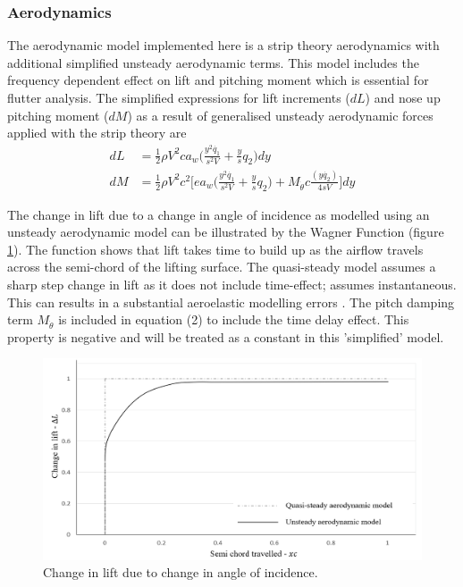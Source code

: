 \documentclass[11pt]{article}
\begin{document}
\subsubsection{Aerodynamics}
The aerodynamic model implemented here is a strip theory aerodynamics with additional simplified unsteady aerodynamic terms. This model includes the frequency dependent effect on lift and pitching moment which is essential for flutter analysis. The simplified expressions for lift increments ($dL$) and nose up pitching moment ($dM$) as a result of generalised unsteady aerodynamic forces applied with the strip theory are 
\begin{align}
dL &= \frac{1}{2}\rho V^2ca_w\Big( \frac{y^2\dot{q_1}}{s^2V}+\frac{y}{s}q_2\Big)dy\\
dM &= \frac{1}{2}\rho V^2 c^2\Big[ea_w\Big(\frac{y^2\dot{q_1}}{s^2V}+\frac{y}{s}q_2\Big)+M_{\dot{\theta}}c\frac{(y\dot{q_2})}{4sV}\Big]dy
\end{align}

The change in lift due to a change in angle of incidence as modelled using an unsteady aerodynamic model can be illustrated by the Wagner Function (figure \ref{fig:wagner}). The function shows that lift takes time to build up as the  airflow travels across the semi-chord of the lifting surface. The quasi-steady model assumes a sharp step change in lift as it does not include time-effect; assumes instantaneous. This can results in a substantial aeroelastic modelling errors \cite{Wright2015INTRODUCTIONLOADS}. The pitch damping term $M_{\dot{\theta}}$ is included in equation (2) to include the time delay effect. This property is negative and will be treated as a constant in this 'simplified' model.

\begin{figure}[H]
    \centering
    \includegraphics[width = .8\textwidth]{figures/wagner-func.png}
    \caption{Change in lift due to change in angle of incidence.}
    \label{fig:wagner}
\end{figure}
\end{document}
